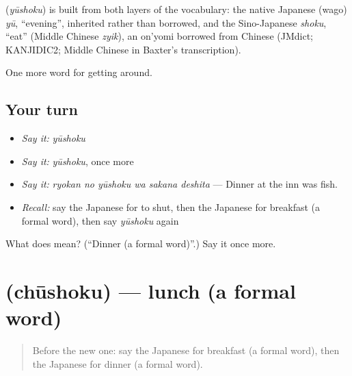\begin{cousinweb}
\textbf{} (\emph{yūshoku}) is built from both layers of the vocabulary: the native Japanese (wago) \emph{yū}, \textquotedblleft{}evening\textquotedblright{}, inherited rather than borrowed, and the Sino-Japanese \emph{shoku}, \textquotedblleft{}eat\textquotedblright{} (Middle Chinese \emph{zyik}), an on'yomi borrowed from Chinese (JMdict; KANJIDIC2; Middle Chinese in Baxter's transcription).
\end{cousinweb}

\begin{grammarlens}[title={What you've built}]
One more word for getting around.
\end{grammarlens}

\subsection*{Your turn}
\begin{itemize}
\raggedright
  \item \emph{Say it:} \emph{yūshoku}
  \item \emph{Say it:} \emph{yūshoku}, once more
  \item \emph{Say it:} \emph{ryokan no yūshoku wa sakana deshita} — Dinner at the inn was fish.
  \item \emph{Recall:} say the Japanese for to shut, then the Japanese for breakfast (a formal word), then say \emph{yūshoku} again
\end{itemize}

\begin{tcolorbox}[breakable,colback=teal!4,colframe=teal!35!black,title={Before you move on}]
What does  mean? (\textquotedblleft{}Dinner (a formal word)\textquotedblright{}.) Say it once more.
\end{tcolorbox}
\section[\texorpdfstring{\ja{ちゅうしょく} (chūshoku)}{ちゅうしょく (chūshoku)}]{ (chūshoku) — lunch (a formal word)}

\label{lesson:JA-C401-chuushoku}



\begin{quote}
Before the new one: say the Japanese for breakfast (a formal word), then the Japanese for dinner (a formal word).
\end{quote}

